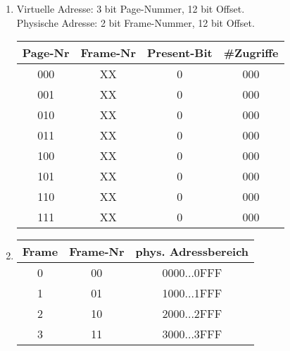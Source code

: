\documentclass[a4paper, 12pt, margins=2cm]{homework}
\begin{document}
\begin{problem}
  
\end{problem}
\begin{solution}\hfill
  \begin{enumerate}[label=(\alph*)]\itemsep0pt
      \item Virtuelle Adresse: 3 bit Page-Nummer, 12 bit Offset.\\
            Physische Adresse: 2 bit Frame-Nummer, 12 bit Offset.\\
            \begin{center}
              \begin{tabular}{|c|c|c|c|}
                \hline
                Page-Nr & Frame-Nr & Present-Bit & \#Zugriffe \\ \hline \hline
                000     & XX       & 0           & 000        \\ \hline
                001     & XX       & 0           & 000        \\ \hline
                010     & XX       & 0           & 000        \\ \hline
                011     & XX       & 0           & 000        \\ \hline
                100     & XX       & 0           & 000        \\ \hline
                101     & XX       & 0           & 000        \\ \hline
                110     & XX       & 0           & 000        \\ \hline
                111     & XX       & 0           & 000        \\ \hline
              \end{tabular}
            \end{center}

      \item \hfill
        \begin{center}
          \begin{tabular}{|c|c|c|}
            \hline
            Frame & Frame-Nr & phys. Adressbereich \\ \hline \hline
            0     & 00       & 0000...0FFF         \\ \hline
            1     & 01       & 1000...1FFF         \\ \hline
            2     & 10       & 2000...2FFF         \\ \hline
            3     & 11       & 3000...3FFF         \\ \hline
          \end{tabular}
        \end{center}


\end{enumerate}
\end{solution}
\end{document}
